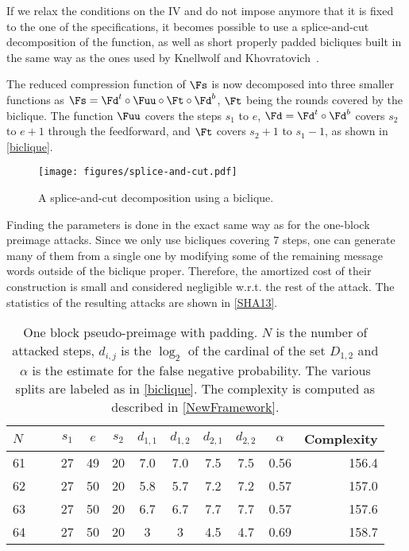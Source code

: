   If we relax the conditions on the IV and do not impose anymore that it is fixed
  to the one of the specifications, it becomes possible to use a splice-and-cut
  decomposition of the function, as well as short properly padded bicliques built in the
  same way as the ones used by Knellwolf and Khovratovich~\cite{DBLP:conf/crypto/KnellwolfK12}.

  The reduced compression function of \shaone $\Fs$ is now decomposed into three smaller
  functions as $\Fs = \Fd^t \circ \Fuu \circ \Ft \circ \Fd^b$, $\Ft$ being the rounds covered by the
  biclique. The function $\Fuu$ covers the steps $s_1$ to $e$, $\Fd = \Fd^t \circ \Fd^b$ covers
  $s_2$ to $e + 1$ through the feedforward, and $\Ft$ covers $s_2 + 1$ to $s_1 - 1$, as shown in
  \autoref{biclique}.

    \begin{figure}
	\center
      \texttt{[image: figures/splice-and-cut.pdf]}
      \caption{A splice-and-cut decomposition using a biclique.\label{biclique}}
    \end{figure}

    Finding the parameters is done in the exact same way as for the one-block preimage attacks.
    Since we only use bicliques covering $7$ steps, one can generate many of them
    from a single one by modifying some of the remaining message words outside of the biclique proper.
    Therefore, the amortized cost of their construction is small and considered negligible w.r.t. the
    rest of the attack. The statistics of the resulting attacks are shown in \autoref{SHA13}.

  \begin{table}[htb]
    \caption[One block pseudo-preimage with padding.]{One block pseudo-preimage with padding. $N$ is the 
              number of attacked steps, $d_{i,j}$ is the $\log_2$ of the cardinal
              of the set $D_{1,2}$ and $\alpha$ is the estimate for the false negative probability.
              The various splits are labeled as in \autoref{biclique}.
            The complexity is computed as described in \autoref{NewFramework}.\label{SHA13}}
    \begin{center}
      \begin{tabular}{l c c c c c  c c c r @{}} \toprule
        $N\qquad$ & $s_1$ & $e$ & $s_2$ & $d_{1,1}$ &  $d_{1,2}$ & $d_{2,1}$ & $d_{2,2}$ & $\alpha $ & Complexity \\\midrule
        61    & 27 & 49 & 20   & 7.0  & 7.0 & 7.5 & 7.5  & 0.56  & 156.4\\ 
        62    & 27 & 50 & 20   & 5.8  & 5.7 & 7.2 & 7.2  & 0.57  & 157.0\\ 
        63    & 27 & 50 & 20   & 6.7  & 6.7 & 7.7 & 7.7  & 0.57  & 157.6\\ 
        64    & 27 & 50 & 20   & 3 & 3 & 4.5 & 4.7  & 0.69  & 158.7\\ 
        \bottomrule
        \hline
      \end{tabular}
    \end{center}
  \end{table}

